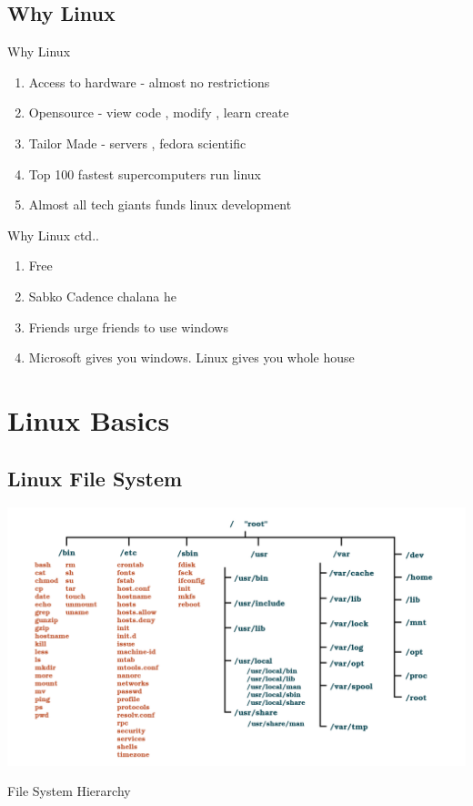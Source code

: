 \documentclass{beamer}
\begin{document}
\subsection{Why Linux}
\begin{frame}{Why Linux}
\begin{enumerate}
	\item<2-> Access to hardware - almost no restrictions
	\item<3-> Opensource - view code , modify , learn create
	\item<4-> Tailor Made - servers , fedora scientific
	\item<5-> Top 100 fastest supercomputers run linux 
	\item<6-> Almost all tech giants funds linux development
\end{enumerate}
\end{frame}
\begin{frame}{Why Linux ctd..}
\begin{enumerate}
	\item<2-> Free
	\item<3-> Sabko Cadence chalana he
	\item<4-> Friends urge friends to use windows 
	\item<5-> Microsoft gives you windows. Linux gives you whole house
\end{enumerate} 
\end{frame}
\section{Linux Basics}
\subsection{Linux File System}
{
	\usebackgroundtemplate%
	{%
	    \includegraphics[width=\paperwidth,height=\paperheight]{./filesystem.pdf}%
	}

	\begin{frame}{File System Hierarchy}
	
\end{frame}
}
\end{document}
